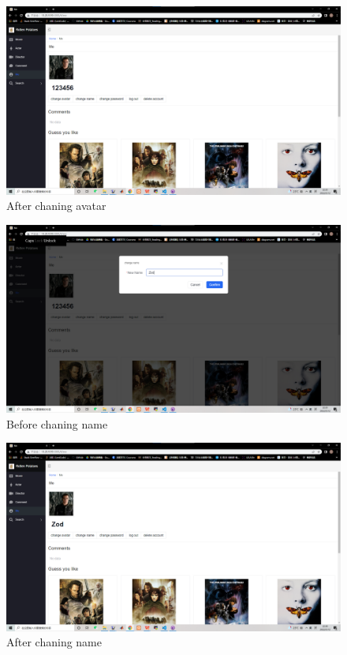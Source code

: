 \begin{CJK*}{UTF8}{gbsn}
    \begin{figure}[htbp]
    \centering
    \includegraphics[width=1\textwidth]{res_avatar2.png}
    \caption{After chaning avatar}
    \end{figure}
    
    \begin{figure}[htbp]
    \centering
    \includegraphics[width=1\textwidth]{res_name1.png}
    \caption{Before chaning name}
    \end{figure}
    
    \begin{figure}[htbp]
    \centering
    \includegraphics[width=1\textwidth]{res_name2.png}
    \caption{After chaning name}
    \end{figure}
    

\end{CJK*}
